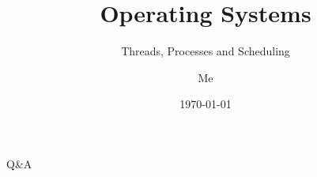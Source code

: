 \documentclass[12pt]{beamer}
\title{Operating Systems}
\subtitle{Threads, Processes and Scheduling}
\author{Me}
\date{\today}
\begin{document}
  \begin{frame}
    \titlepage
  \end{frame}

  
  
  

  \begin{frame}
  \begin{center}
  \Huge Q\&A
  \end{center}
  \end{frame}
\end{document}
